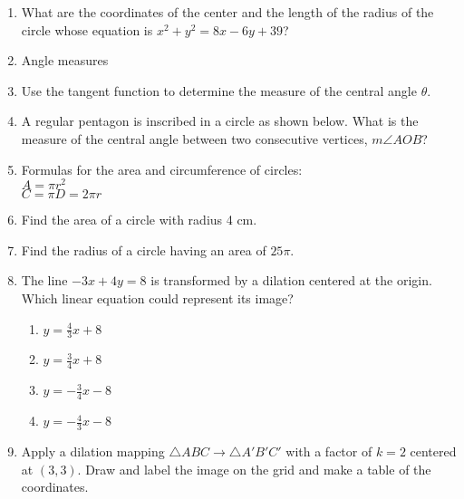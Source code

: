 \documentclass[12pt, twoside]{article}
\begin{document}
\begin{enumerate}
\item What are the coordinates of the center and the length of the radius of the circle whose equation is $x^2 + y^2 = 8x -6y +39$?

\item Angle measures
\item Use the tangent function to determine the measure of the central angle $\theta$.
\item A regular pentagon is inscribed in a circle as shown below. What is the measure of the central angle between two consecutive vertices, $m\angle AOB$?

\item Formulas for the area and circumference of circles:\\
$A=\pi r^2$\\
$C=\pi D = 2\pi r$

\item Find the area of a circle with radius 4 cm.
\item Find the radius of a circle having an area of $25 \pi$.


\newpage
  \item The line $-3x+4y=8$ is transformed by a dilation centered at the origin. Which linear equation could represent its image?
  \begin{multicols}{2}
  \begin{enumerate}
    \item $\displaystyle y=\frac{4}{3}x+8$
    \item $\displaystyle y=\frac{3}{4}x+8$
    \item $\displaystyle y=-\frac{3}{4}x-8$
    \item $\displaystyle y=-\frac{4}{3}x-8$
    \end{enumerate}
  \end{multicols}

  \item Apply a dilation mapping $\triangle ABC \rightarrow \triangle A'B'C'$ with a factor of $k=2$ centered at $(3,3)$. Draw and label the image on the grid and make a table of the coordinates.
    \begin{flushright} %
    \end{flushright}
    

\end{enumerate}
\end{document}
